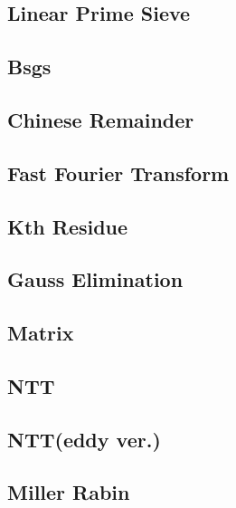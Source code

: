 \documentclass[a4paper,10pt,twocolumn,oneside]{article}
\begin{document}
\subsection{Linear Prime Sieve}


\subsection{Bsgs}


\subsection{Chinese Remainder}


\subsection{Fast Fourier Transform}


\subsection{Kth Residue}


\subsection{Gauss Elimination}


\subsection{Matrix}


\subsection{NTT}


\subsection{NTT(eddy ver.)}


\subsection{Miller Rabin}

\end{document}
